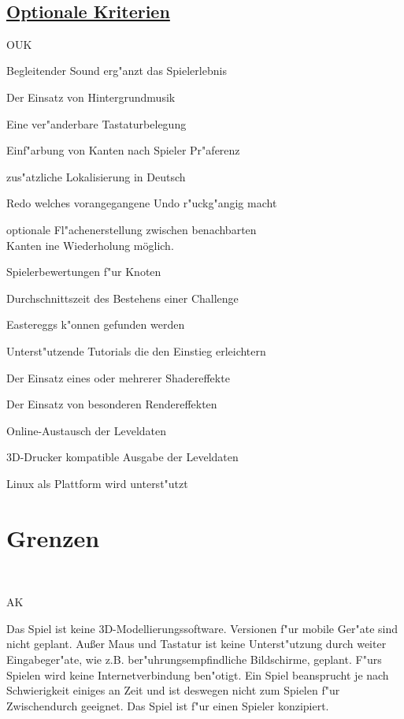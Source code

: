 ~\\


\subsection*{\underline{Optionale Kriterien}}

\begin{ids}{\gls{OUK}}


\id[10] Begleitender Sound erg{"a}nzt das Spielerlebnis

\id[20] Der Einsatz von Hintergrundmusik

\id[30] Eine ver{"a}nderbare Tastaturbelegung

\id[40] Einf{"a}rbung von Kanten nach Spieler Pr{"a}ferenz

\id[50] zus{"a}tzliche Lokalisierung in Deutsch

\id[60] Redo welches vorangegangene Undo r{"u}ckg{"a}ngig macht

\id[70] optionale Fl{"a}chenerstellung zwischen benachbarten \\Kanten
ine Wiederholung möglich.

\id[90] Spielerbewertungen f{"u}r Knoten

\id[100] Durchschnittszeit des Bestehens einer Challenge

\id[110] Eastereggs k{"o}nnen gefunden werden

\id[120] Unterst{"u}tzende Tutorials die den Einstieg erleichtern
	
\id[130] Der Einsatz eines oder mehrerer Shadereffekte

\id[140] Der Einsatz von besonderen Rendereffekten 

\id[150] Online-Austausch der Leveldaten

\id[160] 3D-Drucker kompatible Ausgabe der Leveldaten

\id[170] Linux als Plattform wird unterst{"u}tzt

\end{ids}


%
%
\clearpage


\section{Grenzen}
\label{UF:Grenzen}

~\\

\begin{ids}{\gls{AK}}

	
	\id[10] Das Spiel ist keine 3D-Modellierungssoftware.
	\id[20] Versionen f{"u}r mobile Ger{"a}te sind nicht geplant.
	\id[20] Außer Maus und Tastatur ist keine Unterst{"u}tzung durch weiter Eingabeger{"a}te, \id[60]wie z.B.  ber{"u}hrungsempfindliche Bildschirme, geplant.
	\id[40]F{"u}rs Spielen wird keine Internetverbindung ben{"o}tigt. 
	\id[50] Ein Spiel beansprucht je nach Schwierigkeit einiges an Zeit und ist deswegen nicht \id[60]zum Spielen f{"u}r Zwischendurch geeignet.
	\id[60] Das Spiel ist f{"u}r einen Spieler konzipiert.
	
\end{ids}



